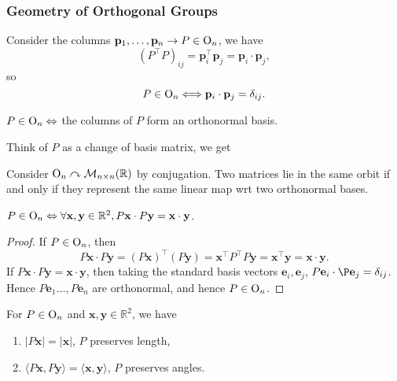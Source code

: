 \documentclass[a4paper]{article}
\begin{document}
    \subsubsection{Geometry of Orthogonal Groups}
    Consider the columns $ \mathbf{p}_1,\dots,\mathbf{p}_n\to P\in \mathrm{O}_n $, we have 
    \[
        (P^\top P)_{ij} = \mathbf{p}_i^\top\mathbf{p}_j = \mathbf{p}_i \cdot \mathbf{p}_j,
    \]
    so
    \[
        P\in \mathrm{O}_n \Longleftrightarrow \mathbf{p}_i \cdot \mathbf{p}_j = \delta_{ij}.
    \]
    \begin{proposition}\label{prop:7.11}
        $ P\in \mathrm{O}_n \Leftrightarrow  $ the columns of $P$ form an orthonormal basis.
    \end{proposition}
    Think of $P$ as a change of basis matrix, we get 
    \begin{proposition}\label{prop:7.12}
        Consider $ \mathrm{O}_n \curvearrowright \mathcal{M}_{n\times n}(\mathbb{R}) $ by conjugation. Two matrices lie in the same orbit if and only if they represent the same linear map wrt two orthonormal bases.
    \end{proposition}
    \begin{proposition}\label{prop:7.13}
        $ P\in \mathrm{O}_n \Leftrightarrow \forall \mathbf{x},\mathbf{y}\in \mathbb{R}^{2}, P\mathbf{x} \cdot P\mathbf{y} = \mathbf{x} \cdot \mathbf{y} $.
    \end{proposition}
    \begin{proof}
        If $ P\in \mathrm{O}_n $, then 
        \[
            P\mathbf{x} \cdot P\mathbf{y} = (P\mathbf{x})^\top(P\mathbf{y}) = \mathbf{x}^\top P^\top P \mathbf{y} = \mathbf{x}^\top \mathbf{y} = \mathbf{x} \cdot \mathbf{y}.
        \]
        If $P\mathbf{x} \cdot P\mathbf{y} = \mathbf{x} \cdot \mathbf{y}$, then taking the standard basis vectors $\mathbf{e}_i,\mathbf{e}_j$, $ P\mathbf{e}_i \cdot \P\mathbf{e}_j = \delta_{ij} $. Hence $ P\mathbf{e}_1 \dots, P\mathbf{e}_n $ are orthonormal, and hence $P\in \mathrm{O}_n$.
    \end{proof}
    \begin{corollary}\label{col:7.13}
        For $P\in \mathrm{O}_n$ and $ \mathbf{x},\mathbf{y}\in \mathbb{R}^{2} $, we have 
        \begin{enumerate}
            \item $ |P\mathbf{x}|=|\mathbf{x}| $, $P$ preserves length,
            \item $ \langle P\mathbf{x},P\mathbf{y} \rangle = \langle \mathbf{x},\mathbf{y} \rangle $, $P$ preserves angles.
        \end{enumerate}
    \end{corollary}
\end{document}
